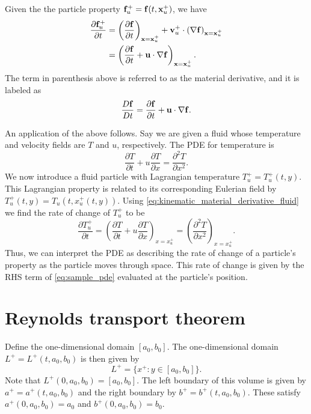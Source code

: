 \documentclass[oneside,a4paper,11pt]{report}
\begin{document}
Given the the particle property $\mathbf{f}^+_u = \mathbf{f}(t,\mathbf{x}^+_u)$, we have
\begin{align}
\label{eq:kinematic_material_derivative_fluid}
\frac{\partial \mathbf{f}^+_u}{\partial t} &=\left(\frac{\partial \mathbf{f}}{\partial t}\right)_{\mathbf{x}=\mathbf{x}^+_u} + \mathbf{v}^+_u \cdot \left(\nabla \mathbf{f}\right)_{\mathbf{x}=\mathbf{x}^+_u} \nonumber \\
&=\left(\frac{\partial \mathbf{f}}{\partial t} + \mathbf{u} \cdot \nabla \mathbf{f}\right)_{\mathbf{x}=\mathbf{x}^+_u}.
\end{align}
The term in parenthesis above is referred to as the material derivative, and it is labeled as
\begin{equation}
\label{eq:material_derivative_definition}
    \frac{D\mathbf{f}}{Dt} = \frac{\partial \mathbf{f}}{\partial t} + \mathbf{u} \cdot \nabla \mathbf{f}.
\end{equation}

An application of the above follows. Say we are given a fluid whose temperature and velocity fields are $T$ and $u$, respectively. The PDE for temperature is
\begin{equation}
\label{eq:sample_pde}
\frac{\partial T}{\partial t} + u\frac{\partial T}{\partial x} = \frac{\partial^2 T}{\partial x^2}.
\end{equation}
We now introduce a fluid particle with Lagrangian temperature $T^+_u = T^+_u(t,y)$. This Lagrangian property is related to its corresponding Eulerian field by $T^+_u(t,y) = T_u(t,x^+_u(t,y))$. Using \cref{eq:kinematic_material_derivative_fluid} we find the rate of change of $T^+_u$ to be
\begin{equation}
\frac{\partial T^+_u}{\partial t} = \left( \frac{\partial T}{\partial t} +  u\frac{\partial T}{\partial x} \right)_{x = x^+_u} = \left ( \frac{\partial^2 T}{\partial x^2} \right)_{x = x^+_u}. 
\end{equation}
Thus, we can interpret the PDE as describing the rate of change of a particle's property as the particle moves through space. This rate of change is given by the RHS term of \cref{eq:sample_pde} evaluated at the particle's position. 

\section{Reynolds transport theorem}
Define the one-dimensional domain $[a_0,b_0]$. The one-dimensional domain $L^+ = L^+(t,a_0,b_0)$ is then given by 
\begin{equation}
    L^+ = \{ x^+ : y \in [a_0,b_0] \}.
\end{equation}
Note that $L^+(0,a_0,b_0) = [a_0,b_0]$. The left boundary of this volume is given by $a^+ = a^+(t,a_0,b_0)$ and the right boundary by $b^+=b^+(t,a_0,b_0)$. These satisfy $a^+(0,a_0,b_0) = a_0$ and $b^+(0,a_0,b_0) = b_0$. 
\end{document}
